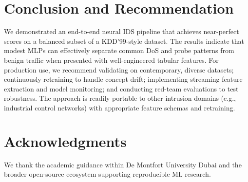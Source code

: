 \documentclass[conference]{IEEEtran}
\begin{document}
\section{Conclusion and Recommendation}
We demonstrated an end-to-end neural IDS pipeline that achieves near-perfect scores on a balanced subset of a KDD'99-style dataset. The results indicate that modest MLPs can effectively separate common DoS and probe patterns from benign traffic when presented with well-engineered tabular features. For production use, we recommend validating on contemporary, diverse datasets; continuously retraining to handle concept drift; implementing streaming feature extraction and model monitoring; and conducting red-team evaluations to test robustness. The approach is readily portable to other intrusion domains (e.g., industrial control networks) with appropriate feature schemas and retraining.

\section*{Acknowledgments}
We thank the academic guidance within De Montfort University Dubai and the broader open-source ecosystem supporting reproducible ML research.



\end{document}
